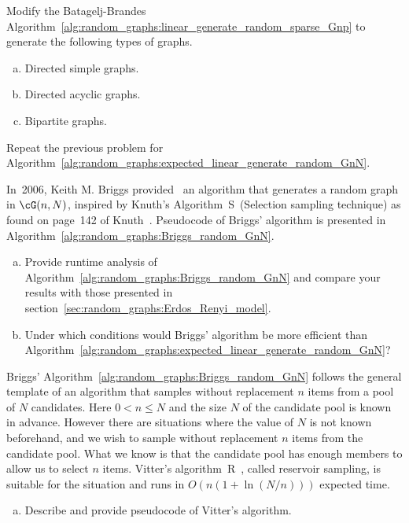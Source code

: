 \begin{problem}
\item Modify the Batagelj-Brandes
  Algorithm~\ref{alg:random_graphs:linear_generate_random_sparse_Gnp}
  to generate the following types of graphs.
  \begin{enumerate}[(a)]
  \item Directed simple graphs.

  \item Directed acyclic graphs.

  \item Bipartite graphs.
  \end{enumerate}

\item Repeat the previous problem for
  Algorithm~\ref{alg:random_graphs:expected_linear_generate_random_GnN}.

\item In~2006, Keith M. Briggs
  provided~\cite{Briggs2011} an algorithm that generates a random
  graph in $\cG(n,N)$, inspired by Knuth's
  Algorithm~S~(Selection sampling technique) as found on page~142 of
  Knuth~\cite{Knuth1998b}. Pseudocode of
  Briggs' algorithm is presented in
  Algorithm~\ref{alg:random_graphs:Briggs_random_GnN}.
  \begin{enumerate}[(a)]
  \item Provide runtime analysis of
    Algorithm~\ref{alg:random_graphs:Briggs_random_GnN} and compare
    your results with those presented in
    section~\ref{sec:random_graphs:Erdos_Renyi_model}.

  \item Under which conditions would Briggs' algorithm be more
    efficient than
    Algorithm~\ref{alg:random_graphs:expected_linear_generate_random_GnN}?
  \end{enumerate}

\item Briggs'
  Algorithm~\ref{alg:random_graphs:Briggs_random_GnN} follows the
  general template of an algorithm that samples without replacement
  $n$ items from a pool of $N$ candidates. Here $0 < n \leq N$ and the
  size $N$ of the candidate pool is known in advance. However there
  are situations where the value of $N$ is not known beforehand, and
  we wish to sample without replacement $n$ items from the candidate
  pool. What we know is that the candidate pool has enough members to
  allow us to select $n$ items. Vitter's
  algorithm~R~\cite{Vitter1985}, called
  reservoir sampling, is suitable for the
  situation and runs in $O(n (1 + \ln(N/n)))$ expected time.
  \begin{enumerate}[(a)]
  \item Describe and provide pseudocode of
    Vitter's algorithm.


\end{enumerate}
\end{problem}
